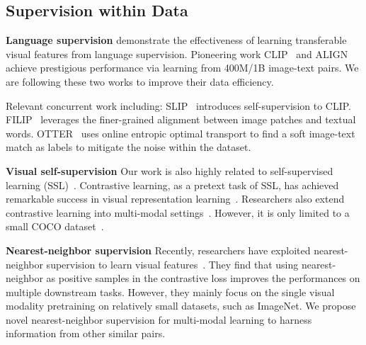 \subsection{Supervision within Data}
\textbf{Language supervision} \citet{joulin2016learning, gomez2017self, zhang2020contrastive, sariyildiz2020learning, desai2021virtex} demonstrate the effectiveness of learning transferable visual features from language supervision. 
Pioneering work CLIP~\citep{radford2021learning} and ALIGN~\citep{jia2021scaling} achieve prestigious performance via learning from 400M/1B image-text pairs. We are following these two works to improve their data efficiency.

Relevant concurrent work including: SLIP~\cite{mu2021slip} introduces self-supervision to CLIP. 
FILIP~\cite{yao2021filip} leverages the finer-grained alignment between image patches and textual words.
OTTER~\cite{wu2021data,cheng2021data} uses online entropic optimal transport to find a soft image-text match as labels to mitigate the noise within the dataset. 


\textbf{Visual self-supervision} Our work is also highly related to self-supervised learning (SSL)~\citep{lecun2021self}. 
Contrastive learning, as a pretext task of SSL, has achieved remarkable success in visual representation learning~\citep{he2020momentum, chen2020simple, caron2020unsupervised, grill2020bootstrap, chen2020simple}. Researchers also extend contrastive learning into multi-modal settings~\citep{yuan2021multimodal}. However, it is only limited to a small COCO dataset~\citep{yuan2021multimodal}.

\textbf{Nearest-neighbor supervision} 
Recently, researchers have exploited nearest-neighbor supervision to learn visual features~\citep{dwibedi2021little, van2021revisiting}.
They find that using nearest-neighbor as positive samples in the contrastive loss improves the performances on multiple downstream tasks. However, they mainly focus on the single visual modality pretraining on relatively small datasets, such as ImageNet. We propose novel nearest-neighbor supervision for multi-modal learning to harness information from other similar pairs.

